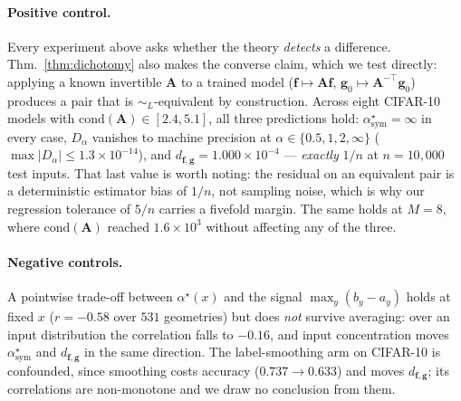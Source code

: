 \documentclass[10pt,letterpaper,twocolumn]{article}
\newcommand{\bff}{\mathbf{f}}
\newcommand{\bfg}{\mathbf{g}}
\newcommand{\dfg}{d_{\bff,\bfg}}
\newcommand{\Dalpha}{D_{\alpha}}
\newcommand{\simL}{\sim_{L}}
\theoremstyle{plain}
\theoremstyle{definition}
\theoremstyle{remark}
\begin{document}
\paragraph{Positive control.}
Every experiment above asks whether the theory \emph{detects} a difference.
Thm.~\ref{thm:dichotomy} also makes the converse claim, which we test directly:
applying a known invertible $\mathbf{A}$ to a trained model
($\bff\mapsto\mathbf{A}\bff$, $\bfg_{0}\mapsto\mathbf{A}^{-\top}\bfg_{0}$)
produces a pair that is $\simL$-equivalent by construction. Across eight
CIFAR-10 models with $\mathrm{cond}(\mathbf{A})\in[2.4,5.1]$, all three
predictions hold: $\alpha^{\star}_{\mathrm{sym}}=\infty$ in every case,
$\Dalpha$ vanishes to machine precision at $\alpha\in\{0.5,1,2,\infty\}$
($\max|\Dalpha|\le1.3\times10^{-14}$), and $\dfg=1.000\times10^{-4}$ ---
\emph{exactly} $1/n$ at $n=10{,}000$ test inputs. That last value is worth
noting: the residual on an equivalent pair is a deterministic estimator bias of
$1/n$, not sampling noise, which is why our regression tolerance of $5/n$
carries a fivefold margin. The same holds at $M{=}8$, where
$\mathrm{cond}(\mathbf{A})$ reached $1.6\times10^{3}$ without affecting any of
the three.

\paragraph{Negative controls.}
A pointwise trade-off between $\alpha^{\star}(x)$ and the signal
$\max_{y}(b_{y}-a_{y})$ holds at fixed $x$ ($r=-0.58$ over $531$ geometries)
but does \emph{not} survive averaging: over an input distribution the
correlation falls to $-0.16$, and input concentration moves
$\alpha^{\star}_{\mathrm{sym}}$ and $\dfg$ in the same direction. The
label-smoothing arm on CIFAR-10 is confounded, since smoothing costs accuracy
($0.737\to0.633$) and moves $\dfg$; its correlations are non-monotone and we
draw no conclusion from them.
\end{document}
